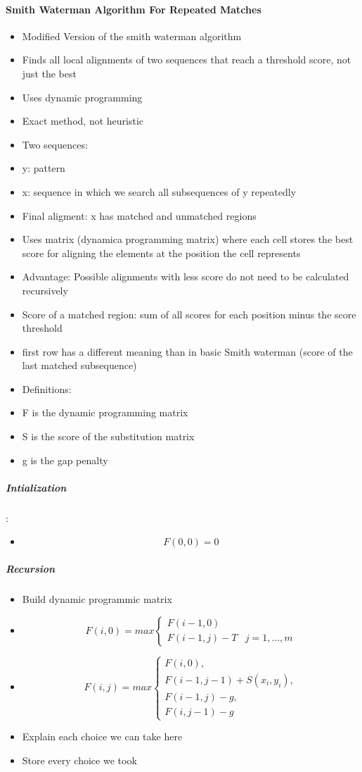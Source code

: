 \paragraph{Smith Waterman Algorithm For Repeated Matches}
\begin{itemize}
	\item Modified Version of the smith waterman algorithm
	\item Finds all local alignments of two sequences that reach a threshold score, not just the best
	\item Uses dynamic programming
	\item Exact method, not heuristic
	\item Two sequences: 
	\item y: pattern
	\item x: sequence in which we search all subsequences of y repeatedly
	\item Final aligment: x has matched and unmatched regions
	\item Uses matrix (dynamica programming matrix) where each cell stores the best score for aligning the elements at the position the cell represents
	\item Advantage: Possible alignments with less score do not need to be calculated recursively
	\item Score of a matched region: sum of all scores for each position minus the score threshold 
	\item first row has a different meaning than in basic Smith waterman (score of the last matched subsequence)
	\item Definitions:
	\item F is the dynamic programming matrix
	\item S is the score of the substitution matrix
	\item g is the gap penalty
\end{itemize}

\subparagraph{Intialization}:
	\begin{itemize}
		\item \[F(0,0) = 0\]
	\end{itemize}

\subparagraph{Recursion}
	\begin{itemize}
		\item Build dynamic programmic matrix
		\item  \[F(i,0) = max \left\{ \begin{array}{lr}F(i-1,0)&\\F(i-1,j)-T& j=1,\dots,m\end{array}\right. \]
		\item  \[F(i,j) = max \left\{ \begin{array}{lr}F(i,0),\\F(i-1,j-1)+S(x_i,y_i),\\F(i-1,j)-g,\\F(i,j-1)-g\end{array}\right.\]
		\item Explain each choice we can take here
		\item Store every choice we took
	\end{itemize}

